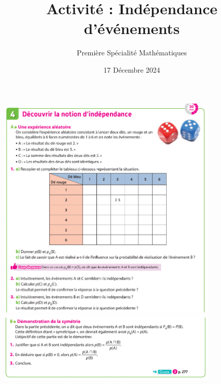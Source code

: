 \documentclass{article}
\title{Activité : Indépendance d'événements}
\author{Première Spécialité Mathématiques}
\date{17 Décembre 2024}
\begin{document}
\maketitle

\begin{center}
\includegraphics[width=0.8\textwidth]{Activite_1.png}
\includegraphics[width=0.8\textwidth]{Activite_2.png}
\end{center}
\end{document}
